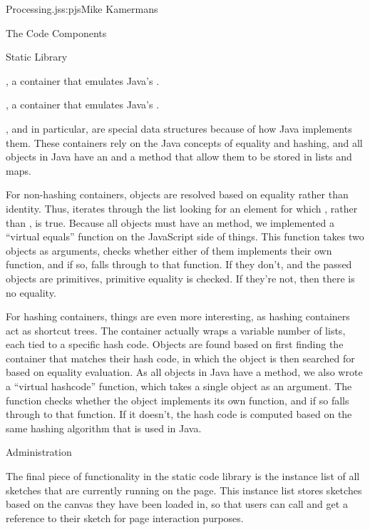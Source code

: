 \begin{aosachapter}{Processing.js}{s:pjs}{Mike Kamermans}
\begin{aosasect1}{The Code Components}
\begin{aosasect2}{Static Library}
\begin{aosadescription}
\item{}, a container that emulates Java's .

\item{}, a container that emulates Java's .

, and  in particular, are special data structures
because of how Java implements them. These containers rely on the Java
concepts of equality and hashing, and all objects in Java have an
 and a  method that allow them to be
stored in lists and maps.

For non-hashing containers, objects are resolved based on equality
rather than identity. Thus,  iterates through the
list looking for an element for which , rather
than , is true. Because all objects must have an
 method, we implemented a ``virtual equals'' function on
the JavaScript side of things. This function takes two objects as
arguments, checks whether either of them implements their own
 function, and if so, falls through to that function.
If they don't, and the passed objects are primitives,
primitive equality is checked. If they're not, then there is no
equality.

For hashing containers, things are even more interesting, as hashing
containers act as shortcut trees. The container actually wraps a
variable number of lists, each tied to a specific hash code. Objects
are found based on first finding the container that matches their hash
code, in which the object is then searched for based on equality
evaluation. As all objects in Java have a  method, we also
wrote a ``virtual hashcode'' function, which takes a single object as
an argument. The function checks whether the object implements its own
 function, and if so falls through to that function.
If it doesn't, the hash code is computed based on the same
hashing algorithm that is used in Java.

\end{aosadescription}

\begin{aosasect3}{Administration}

The final piece of functionality in the static code library is the
instance list of all sketches that are currently running on the
page. This instance list stores sketches based on the canvas they have
been loaded in, so that users can call
 and get a reference to their
sketch for page interaction purposes.


\end{aosasect3}
\end{aosasect2}
\end{aosasect1}
\end{aosachapter}
